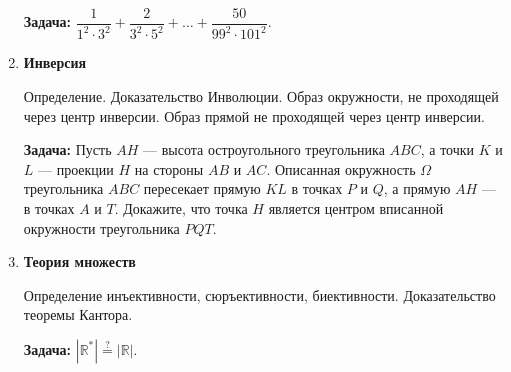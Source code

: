 \documentclass{article}
\begin{document}
\begin{enumerate}[label*=\protect\fbox{\arabic{enumi}}]
\textbf{Задача:} $\dfrac{1}{1^2 \cdot 3^2} + \dfrac{2}{3^2 \cdot 5^2} + \dotsc +  \dfrac{50}{99^2 \cdot 101^2}.$

\item \textbf{Инверсия}	

Определение. Доказательство Инволюции. Образ окружности, не проходящей через центр инверсии. Образ прямой не проходящей через центр инверсии.

\textbf{Задача:} Пусть $AH$ — высота остроугольного треугольника $ABC$, а точки $K$ и $L$ — проекции $H$ на стороны $AB$ и $AC$. Описанная окружность $\Omega$ треугольника $ABC$ пересекает прямую $KL$ в точках $P$ и $Q$, а прямую $AH$ — в точках $A$ и $T$. Докажите, что точка $H$ является центром вписанной окружности треугольника $PQT$.

\item \textbf{Теория множеств}

Определение инъективности, сюръективности, биективности. Доказательство теоремы Кантора.

\textbf{Задача:}   $|\mathbb{R}^*| \stackrel{?}{=} |\mathbb{R}|.$

\end{enumerate}
\end{document}
